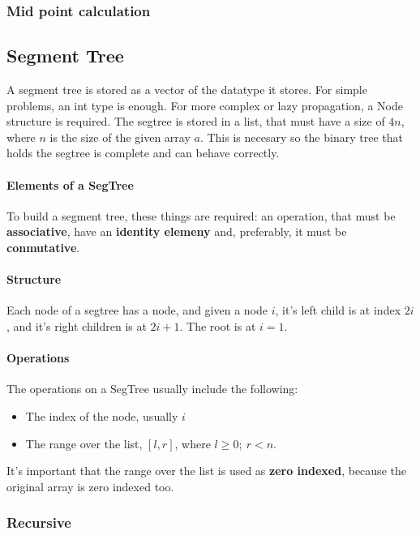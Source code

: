 \documentclass[a4paper,10pt,twocolumn, titlepage]{article}
\begin{document}


\subsubsection{Mid point calculation}

\subsection{Segment Tree}
A segment tree is stored as a vector of the datatype it stores. For simple problems, an int type is enough. For more complex or lazy propagation, a Node structure is required. The segtree is stored in a list, that must have a size of $4n$, where $n$ is the size of the given array $a$. This is necesary so the binary tree that holds the segtree is complete and can behave correctly.

\paragraph{Elements of a SegTree} To build a segment tree, these things are required: an operation, that must be \textbf{associative}, have an \textbf{identity elemeny} and, preferably, it must be \textbf{conmutative}.

\paragraph{Structure} Each node of a segtree has a node, and given a node $i$, it's left child is at index $2i$, and it's right children is at $2i + 1$. The root is at $i=1$.

\paragraph{Operations} The operations on a SegTree usually include the following:
\begin{itemize}
 \item The index of the node, usually $i$
 \item The range over the list, $[l, r]$, where $l \geq 0;~ r <n$.
\end{itemize}
It's important that the range over the list is used as \textbf{zero indexed}, because the original array is zero indexed too.

\subsubsection{Recursive}
\end{document}
